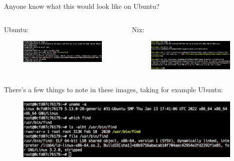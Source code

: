 \documentclass{beamer}
\begin{document}
\begin{frame}
    \centering Anyone know what this would look like on Ubuntu?
\end{frame}

\begin{frame}
    \begin{columns}
        \begin{column}{0.5\textwidth}
            \centering
            Ubuntu:
            \begin{figure}
                \centering
                \includegraphics[width=\textwidth,keepaspectratio]{../resources/ubuntu-find.png}
            \end{figure}
        \end{column}
        \begin{column}{0.5\textwidth}
            \centering
            Nix:
            \begin{figure}
                \centering
                \includegraphics[width=\textwidth,keepaspectratio]{../resources/nix-find.png}
            \end{figure}
        \end{column}
    \end{columns}
\end{frame}

\begin{frame}
    There's a few things to note in these images, taking for example Ubuntu:
    \begin{figure}
        \centering
        \includegraphics[width=\textwidth,keepaspectratio]{../resources/ubuntu-find.png}
    \end{figure}
\end{frame}
\end{document}
